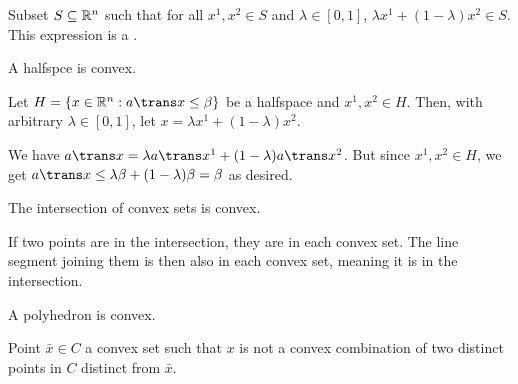 \begin{defn}[convexity]
  Subset $S \subseteq \mathbb{R}^n$ such that for all
  $x^1, x^2 \in S$ and $\lambda \in [0,1]$,
  $\lambda x^1 + (1-\lambda)x^2 \in S$.
  This expression is a .
\end{defn}

\begin{prop}
  A halfspce is convex.
\end{prop}
\begin{prf}
  Let $H = \{x \in \R^n : a\trans x \leq \beta\}$ be a halfspace and $x^1, x^2 \in H$.
  Then, with arbitrary $\lambda \in [0,1]$, let $x = \lambda x^1 + (1-\lambda)x^2$.

  We have $a\trans x = \lambda a\trans x^1 + (1-\lambda) a\trans x^2$.
  But since $x^1, x^2 \in H$, we get
  $a\trans x \leq \lambda \beta + (1-\lambda)\beta = \beta$ as desired.
\end{prf}

\begin{prop}
  The intersection of convex sets is convex.
\end{prop}
\begin{prf}
  If two points are in the intersection, they are in each convex set.
  The line segment joining them is then also in each convex set,
  meaning it is in the intersection.
\end{prf}

\begin{corollary}
  A polyhedron is convex.
\end{corollary}

\begin{defn}
  Point $\bar x \in C$ a convex set such that $x$ is not
  a convex combination of two distinct points in $C$ distinct from $\bar x$.
\end{defn}


